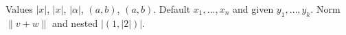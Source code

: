 Values $|x|$, $|x|$, $|\alpha|$, $(a, b)$, $(a, b)$.
Default $x_1, \dots, x_n$ and given $y_1, \dots, y_k$.
Norm $\|v + w\|$ and nested $|(1, |2|)|$.
